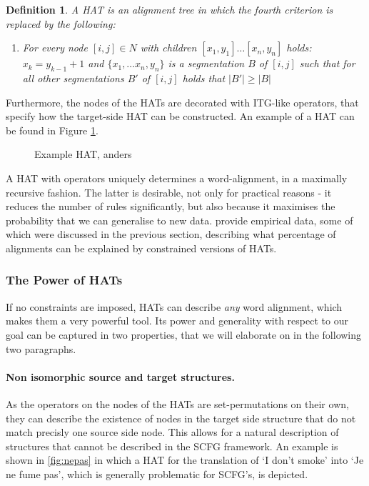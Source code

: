 \documentclass[a4paper, 11pt]{report}
\theoremstyle{definition}
\theoremstyle{plain}
\newtheorem{definition}{Definition}
\begin{document}
\begin{definition}
A HAT is an alignment tree in which the fourth criterion is replaced by the following:
\begin{enumerate}
\item[4.] For every node $[i,j] \in N$ with children $[x_1,y_1]\ldots [x_n,y_n]$ holds: $x_k = y_{k-1}+1$ and $\{x_1,\ldots x_n, y_n\}$ is a segmentation $B$ of $[i,j]$ such that for all other segmentations $B'$ of $[i,j]$ holds that $|B'|\geq |B|$ %
\end{enumerate}
\end{definition}

Furthermore, the nodes of the HATs are decorated with ITG-like operators, that specify how the target-side HAT can be constructed. An example of a HAT can be found in Figure \ref{fig:hat}.

\begin{figure}
\caption{Example HAT, anders}\label{fig:hat}
\end{figure}

A HAT with operators uniquely determines a word-alignment, in a maximally recursive fashion. The latter is desirable, not only for practical reasons - it reduces the number of rules significantly, but also because it maximises the probability that we can generalise to new data. \cite{simaan2013hats} provide empirical data, some of which were discussed in the previous section, describing what percentage of alignments can be explained by constrained versions of HATs. 

\subsubsection{The Power of HATs}

If no constraints are imposed, HATs can describe \textit{any} word alignment, which makes them a very powerful tool. Its power and generality with respect to our goal can be captured in two properties, that we will elaborate on in the following two paragraphs.

\paragraph{Non isomorphic source and target structures.} As the operators on the nodes of the HATs are set-permutations on their own, they can describe the existence of nodes in the target side structure that do not match precisly one source side node. This allows for a natural description of structures that cannot be described in the SCFG framework. An example is shown in \ref{fig:nepas} in which a HAT for the translation of `I don't smoke' into `Je ne fume pas', which is generally problematic for SCFG's, is depicted.
\end{document}
